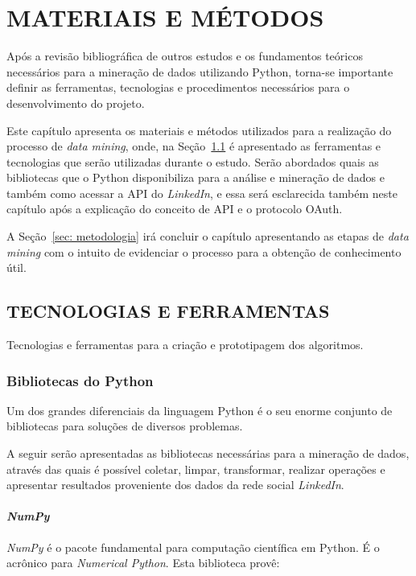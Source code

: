 \chapter{MATERIAIS E MÉTODOS}\label{ch:materiais-metodos}
Após a revisão bibliográfica de outros estudos e os fundamentos teóricos necessários para a mineração de dados utilizando Python, torna-se importante definir as ferramentas, tecnologias e procedimentos necessários para o desenvolvimento do projeto.

Este capítulo apresenta os materiais e métodos utilizados para a realização do processo de \textit{data mining}, onde, na Seção~\ref{sec: tec-ferramenta} é apresentado as ferramentas e tecnologias que serão utilizadas durante o estudo. Serão abordados quais as bibliotecas que o Python disponibiliza para a análise e mineração de dados e também como acessar a API do \textit{LinkedIn}, e essa será esclarecida também neste capítulo após a explicação do conceito de API e o protocolo OAuth.

A Seção~\ref{sec: metodologia} irá concluir o capítulo apresentando as etapas de \textit{data mining} com o intuito de evidenciar o processo para a obtenção de conhecimento útil.

\section{TECNOLOGIAS E FERRAMENTAS}\label{sec: tec-ferramenta}
Tecnologias e ferramentas para a criação e prototipagem dos algoritmos.

\subsection{Bibliotecas do Python}\label{sec:bib_python}
Um dos grandes diferenciais da linguagem Python é o seu enorme conjunto de bibliotecas para soluções de diversos problemas.

A seguir serão apresentadas as bibliotecas necessárias para a mineração de dados, através das quais é possível coletar, limpar, transformar, realizar operações e apresentar resultados proveniente dos dados da rede social \textit{LinkedIn}.
 
\subsubsection{\textbf{\textit{NumPy}}}
\textit{NumPy} é o pacote fundamental para computação científica em Python. É o acrônico para \textit{Numerical Python}. Esta biblioteca provê:

